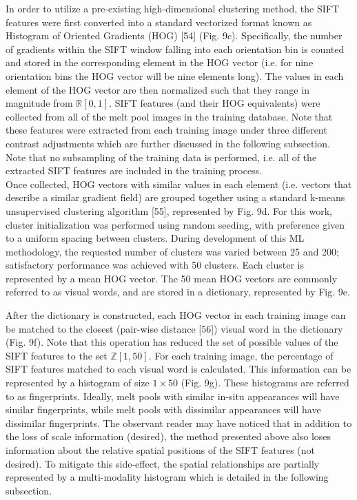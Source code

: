 \documentclass[10pt]{article}
\begin{document}
In order to utilize a pre-existing high-dimensional clustering method, the SIFT features were first converted into a standard vectorized format known as Histogram of Oriented Gradients (HOG) [54] (Fig. 9c). Specifically, the number of gradients within the SIFT window falling into each orientation bin is counted and stored in the corresponding element in the HOG vector (i.e. for nine orientation bins the HOG vector will be nine elements long). The values in each element of the HOG vector are then normalized such that they range in magnitude from $\mathbb{R}[0,1]$. SIFT features (and their HOG equivalents) were collected from all of the melt pool images in the training database. Note that these features were extracted from each training image under three different contrast adjustments which are further discussed in the following subsection. Note that no subsampling of the training data is performed, i.e. all of the extracted SIFT features are included in the training process.\\
Once collected, HOG vectors with similar values in each element (i.e. vectors that describe a similar gradient field) are grouped together using a standard k-means unsupervised clustering algorithm [55], represented by Fig. 9d. For this work, cluster initialization was performed using random seeding, with preference given to a uniform spacing between clusters. During development of this ML methodology, the requested number of clusters was varied between 25 and 200; satisfactory performance was achieved with 50 clusters. Each cluster is represented by a mean HOG vector. The 50 mean HOG vectors are commonly referred to as visual words, and are stored in a dictionary, represented by Fig. 9e.

After the dictionary is constructed, each HOG vector in each training image can be matched to the closest (pair-wise distance [56]) visual word in the dictionary (Fig. 9f). Note that this operation has reduced the set of possible values of the SIFT features to the set $\mathbb{Z}[1,50]$. For each training image, the percentage of SIFT features matched to each visual word is calculated. This information can be represented by a histogram of size $1 \times 50$ (Fig. 9g). These histograms are referred to as fingerprints. Ideally, melt pools with similar in-situ appearances will have similar fingerprints, while melt pools with dissimilar appearances will have dissimilar fingerprints. The observant reader may have noticed that in addition to the loss of scale information (desired), the method presented above also loses information about the relative spatial positions of the SIFT features (not desired). To mitigate this side-effect, the spatial relationships are partially represented by a multi-modality histogram which is detailed in the following subsection.
\end{document}
